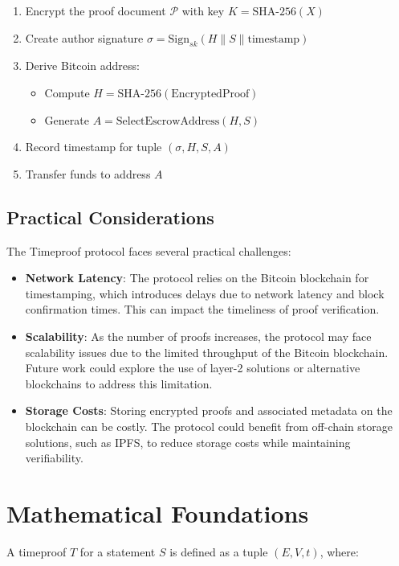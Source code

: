 \documentclass[12pt]{report}
\begin{document}
\begin{enumerate}
    \item Encrypt the proof document \( \mathcal{P} \) with key \( K = \text{SHA-256}(X) \)
    \item Create author signature $\sigma = \text{Sign}_{sk}(H \parallel S \parallel \text{timestamp})$
    \item Derive Bitcoin address:
    \begin{itemize}
        \item Compute \( H = \text{SHA-256}(\text{EncryptedProof}) \)
        \item Generate \( A = \text{SelectEscrowAddress}(H, S) \)
    \end{itemize}
    \item Record timestamp for tuple $(\sigma, H, S, A)$
    \item Transfer funds to address \( A \)
\end{enumerate}

\subsection{Practical Considerations}

The Timeproof protocol faces several practical challenges:
\begin{itemize}
    \item \textbf{Network Latency}: The protocol relies on the Bitcoin blockchain for timestamping, which introduces delays due to network latency and block confirmation times. This can impact the timeliness of proof verification.
    \item \textbf{Scalability}: As the number of proofs increases, the protocol may face scalability issues due to the limited throughput of the Bitcoin blockchain. Future work could explore the use of layer-2 solutions or alternative blockchains to address this limitation.
    \item \textbf{Storage Costs}: Storing encrypted proofs and associated metadata on the blockchain can be costly. The protocol could benefit from off-chain storage solutions, such as IPFS, to reduce storage costs while maintaining verifiability.
\end{itemize}

\section{Mathematical Foundations}

A timeproof \( T \) for a statement \( S \) is defined as a tuple \( (E, V, t) \), where:
\end{document}
